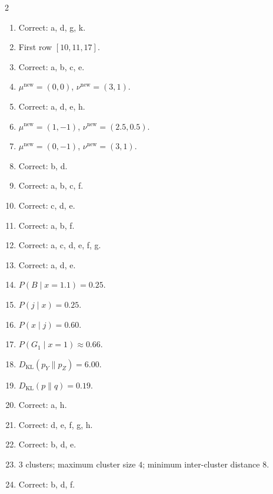 \documentclass[11pt,oneside]{article}
\begin{document}
\begin{keybox}
\begin{multicols}{2}
\begin{enumerate}[leftmargin=*,label=\textbf{Q\arabic*.}]
  \item Correct: a, d, g, k.
  \item First row $[10,11,17]$.
  \item Correct: a, b, c, e.
  \item $\mu^{\mathrm{new}}=(0,0)$, $\nu^{\mathrm{new}}=(3,1)$.
  \item Correct: a, d, e, h.
  \item $\mu^{\mathrm{new}}=(1,-1)$, $\nu^{\mathrm{new}}=(2.5,0.5)$.
  \item $\mu^{\mathrm{new}}=(0,-1)$, $\nu^{\mathrm{new}}=(3,1)$.
  \item Correct: b, d.
  \item Correct: a, b, c, f.
  \item Correct: c, d, e.
  \item Correct: a, b, f.
  \item Correct: a, c, d, e, f, g.
  \item Correct: a, d, e.
  \item $P(B\mid x=1.1)=0.25$.
  \item $P(j\mid x)=0.25$.
  \item $P(x\mid j)=0.60$.
  \item $P(G_1\mid x=1)\approx 0.66$.
  \item $D_{\mathrm{KL}}(p_Y\|p_Z)=6.00$.
  \item $D_{\mathrm{KL}}(p\|q)=0.19$.
  \item Correct: a, h.
  \item Correct: d, e, f, g, h.
  \item Correct: b, d, e.
  \item $3$ clusters; maximum cluster size $4$; minimum inter-cluster distance $8$.
  \item Correct: b, d, f.
\end{enumerate}
\end{multicols}
\end{keybox}
\end{document}
